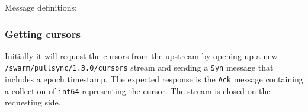 Message definitions:
\begin{Shaded}
\begin{Highlighting}[]
\NormalTok{;}



   \NormalTok{;}
  \NormalTok{;}
\NormalTok{\}}

  \NormalTok{;}
  \NormalTok{;}
\NormalTok{\}}

  \NormalTok{;}
  \NormalTok{;}
\NormalTok{\}}

  \NormalTok{;}
  \NormalTok{;}
\NormalTok{\}}

  \NormalTok{;}
\NormalTok{\}}

  \NormalTok{;}
  \NormalTok{;}
  \NormalTok{;}
\NormalTok{\}}
\end{Highlighting}
\end{Shaded}

\subsubsection{Getting cursors}\label{getting-cursors}

Initially it will request the cursors from the upstream by opening up a
new \texttt{/swarm/pullsync/1.3.0/cursors} stream and sending a \texttt{Syn} message that includes a epoch timestamp. The expected response is the \texttt{Ack} message containing a collection of \texttt{int64} representing the cursor. The stream is closed on the requesting side.

